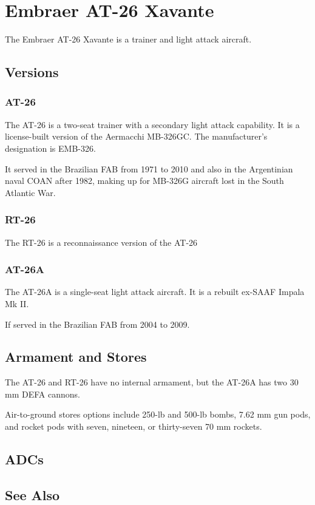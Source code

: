 \section{Embraer AT-26 Xavante}

The Embraer AT-26 Xavante is a trainer and light attack aircraft.

\subsection{Versions}

\subsubsection{AT-26}

The AT-26 is a two-seat trainer with a secondary light attack capability. It is a license-built version of the Aermacchi MB-326GC. The manufacturer’s designation is EMB-326. 

It served in the Brazilian FAB from 1971 to 2010 and also in the Argentinian naval COAN after 1982, making up for MB-326G aircraft lost in the South Atlantic War. 

\subsubsection{RT-26}

The RT-26 is a reconnaissance version of the AT-26

\subsubsection{AT-26A}

The AT-26A is a single-seat light attack aircraft. It is a rebuilt ex-SAAF Impala Mk II. 

If served in the Brazilian FAB from 2004 to 2009.

\subsection{Armament and Stores}

The AT-26 and RT-26 have no internal armament, but the AT-26A has two 30 mm DEFA cannons.

Air-to-ground stores options include 250-lb and 500-lb bombs, 7.62 mm gun pods, and rocket pods with seven, nineteen, or thirty-seven 70 mm rockets.

\subsection{ADCs}

\begin{adclist}
\end{adclist}

\subsection{See Also}

\begin{typelist}
\end{typelist}

